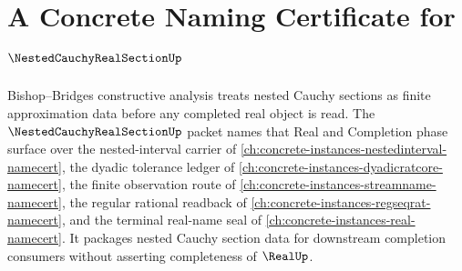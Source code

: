 \chapter{A Concrete Naming Certificate for $\NestedCauchyRealSectionUp$}
\label{ch:concrete-instances-nested-cauchy-real-section-namecert}

Bishop--Bridges constructive analysis treats nested Cauchy sections as finite approximation data before any completed real object is read. The $\NestedCauchyRealSectionUp$ packet names that Real and Completion phase surface over the nested-interval carrier of \autoref{ch:concrete-instances-nestedinterval-namecert}, the dyadic tolerance ledger of \autoref{ch:concrete-instances-dyadicratcore-namecert}, the finite observation route of \autoref{ch:concrete-instances-streamname-namecert}, the regular rational readback of \autoref{ch:concrete-instances-regseqrat-namecert}, and the terminal real-name seal of \autoref{ch:concrete-instances-real-namecert}. It packages nested Cauchy section data for downstream completion consumers without asserting completeness of $\RealUp$.

